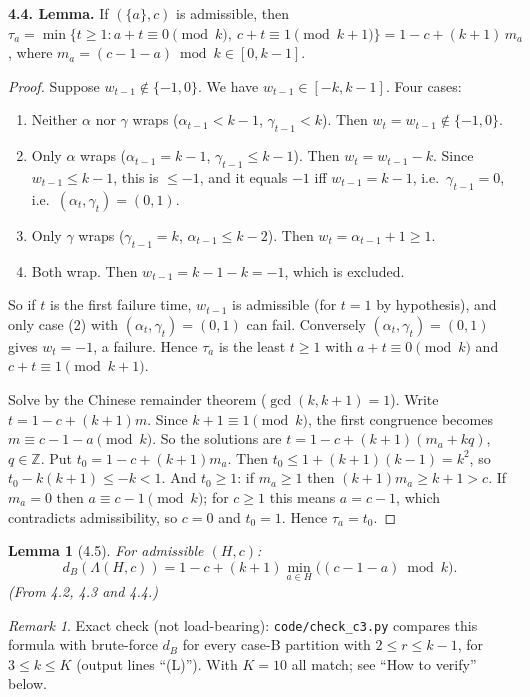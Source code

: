 \documentclass[11pt]{article}
\newtheorem{lemma}{Lemma}
\theoremstyle{remark}
\newtheorem*{remark}{Remark}
\begin{document}
\textbf{4.4. Lemma.} If $(\{a\},c)$ is admissible, then
$\tau_a=\min\{t\ge1: a+t\equiv0\pmod k,\ c+t\equiv1\pmod{k+1}\}=1-c+(k+1)\,m_a$, where
$m_a=(c-1-a)\bmod k\in[0,k-1]$.

\begin{proof}
Suppose $w_{t-1}\notin\{-1,0\}$. We have $w_{t-1}\in[-k,k-1]$. Four cases:
\begin{enumerate}\renewcommand{\labelenumi}{(\arabic{enumi})}
\item Neither $\alpha$ nor $\gamma$ wraps ($\alpha_{t-1}<k-1$, $\gamma_{t-1}<k$). Then $w_t=w_{t-1}\notin\{-1,0\}$.
\item Only $\alpha$ wraps ($\alpha_{t-1}=k-1$, $\gamma_{t-1}\le k-1$). Then $w_t=w_{t-1}-k$. Since $w_{t-1}\le k-1$,
this is $\le-1$, and it equals $-1$ iff $w_{t-1}=k-1$, i.e.\ $\gamma_{t-1}=0$, i.e.\ $(\alpha_t,\gamma_t)=(0,1)$.
\item Only $\gamma$ wraps ($\gamma_{t-1}=k$, $\alpha_{t-1}\le k-2$). Then $w_t=\alpha_{t-1}+1\ge1$.
\item Both wrap. Then $w_{t-1}=k-1-k=-1$, which is excluded.
\end{enumerate}
So if $t$ is the first failure time, $w_{t-1}$ is admissible (for $t=1$ by hypothesis), and only case (2) with
$(\alpha_t,\gamma_t)=(0,1)$ can fail. Conversely $(\alpha_t,\gamma_t)=(0,1)$ gives $w_t=-1$, a failure. Hence
$\tau_a$ is the least $t\ge1$ with $a+t\equiv0\pmod k$ and $c+t\equiv1\pmod{k+1}$.

Solve by the Chinese remainder theorem ($\gcd(k,k+1)=1$). Write $t=1-c+(k+1)m$. Since $k+1\equiv1\pmod k$, the
first congruence becomes $m\equiv c-1-a\pmod k$. So the solutions are $t=1-c+(k+1)(m_a+kq)$, $q\in\mathbb Z$. Put
$t_0=1-c+(k+1)m_a$. Then $t_0\le 1+(k+1)(k-1)=k^2$, so $t_0-k(k+1)\le -k<1$. And $t_0\ge1$: if $m_a\ge1$ then
$(k+1)m_a\ge k+1>c$. If $m_a=0$ then $a\equiv c-1\pmod k$; for $c\ge1$ this means $a=c-1$, which contradicts
admissibility, so $c=0$ and $t_0=1$. Hence $\tau_a=t_0$.
\end{proof}

\begin{lemma}[4.5]\label{lem:R4}
For admissible $(H,c)$:
\[
d_B(\Lambda(H,c))=1-c+(k+1)\min_{a\in H}\big((c-1-a)\bmod k\big).
\]
(From 4.2, 4.3 and 4.4.)
\end{lemma}

\begin{remark}
Exact check (not load-bearing): \texttt{code/check\_c3.py} compares this formula with brute-force $d_B$ for every
case-B partition with $2\le r\le k-1$, for $3\le k\le K$ (output lines ``(L)''). With $K=10$ all match; see
``How to verify'' below.
\end{remark}
\end{document}
